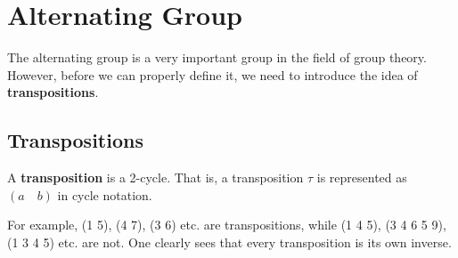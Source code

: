 \section{Alternating Group}
The alternating group is a very important group in the field of group theory. However, before we can properly define it, we need to introduce the idea of \textbf{transpositions}.

\subsection{Transpositions}
\begin{definition}
    A \textbf{transposition} is a 2-cycle. That is, a transposition $\tau$ is represented as $(a\quad b)$ in cycle notation.
\end{definition}
For example, (1 5), (4 7), (3 6) etc. are transpositions, while (1 4 5), (3 4 6 5 9), (1 3 4 5) etc. are not. One clearly sees that every transposition is its own inverse.


